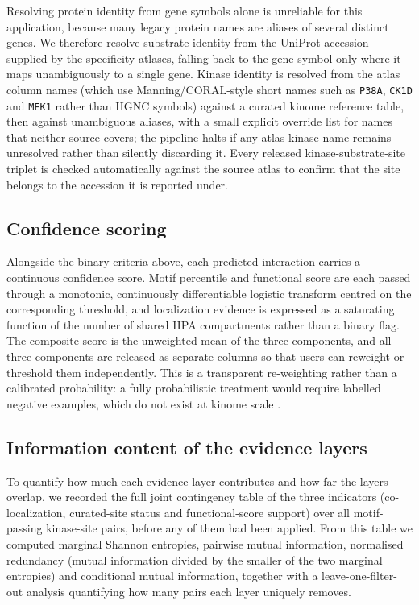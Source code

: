\documentclass[
  number,
  preprint,
  onecolumn]{elsarticle}
\begin{document}
Resolving protein identity from gene symbols alone is unreliable for
this application, because many legacy protein names are aliases of
several distinct genes. We therefore resolve substrate identity from the
UniProt accession supplied by the specificity atlases, falling back to
the gene symbol only where it maps unambiguously to a single gene.
Kinase identity is resolved from the atlas column names (which use
Manning/CORAL-style short names such as \texttt{P38A}, \texttt{CK1D} and
\texttt{MEK1} rather than HGNC symbols) against a curated kinome
reference table, then against unambiguous aliases, with a small explicit
override list for names that neither source covers; the pipeline halts
if any atlas kinase name remains unresolved rather than silently
discarding it. Every released kinase-substrate-site triplet is checked
automatically against the source atlas to confirm that the site belongs
to the accession it is reported under.

\subsection{Confidence scoring}\label{confidence-scoring}

Alongside the binary criteria above, each predicted interaction carries
a continuous confidence score. Motif percentile and functional score are
each passed through a monotonic, continuously differentiable logistic
transform centred on the corresponding threshold, and localization
evidence is expressed as a saturating function of the number of shared
HPA compartments rather than a binary flag. The composite score is the
unweighted mean of the three components, and all three components are
released as separate columns so that users can reweight or threshold
them independently. This is a transparent re-weighting rather than a
calibrated probability: a fully probabilistic treatment would require
labelled negative examples, which do not exist at kinome scale
\citep{Invergo2022-iv, Horn2014-kx}.

\subsection{Information content of the evidence
layers}\label{information-content-of-the-evidence-layers}

To quantify how much each evidence layer contributes and how far the
layers overlap, we recorded the full joint contingency table of the
three indicators (co-localization, curated-site status and
functional-score support) over all motif-passing kinase-site pairs,
before any of them had been applied. From this table we computed
marginal Shannon entropies, pairwise mutual information, normalised
redundancy (mutual information divided by the smaller of the two
marginal entropies) and conditional mutual information, together with a
leave-one-filter-out analysis quantifying how many pairs each layer
uniquely removes.
\end{document}
